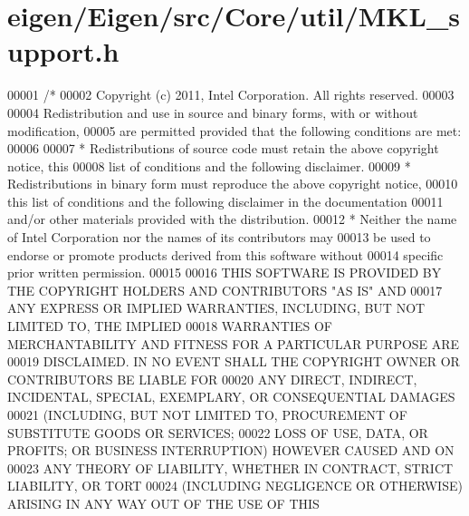 \hypertarget{eigen_2_eigen_2src_2_core_2util_2_m_k_l__support_8h_source}{}\section{eigen/\+Eigen/src/\+Core/util/\+M\+K\+L\+\_\+support.h}
\label{eigen_2_eigen_2src_2_core_2util_2_m_k_l__support_8h_source}

\begin{DoxyCode}
00001 \textcolor{comment}{/*}
00002 \textcolor{comment}{ Copyright (c) 2011, Intel Corporation. All rights reserved.}
00003 \textcolor{comment}{}
00004 \textcolor{comment}{ Redistribution and use in source and binary forms, with or without modification,}
00005 \textcolor{comment}{ are permitted provided that the following conditions are met:}
00006 \textcolor{comment}{}
00007 \textcolor{comment}{ * Redistributions of source code must retain the above copyright notice, this}
00008 \textcolor{comment}{   list of conditions and the following disclaimer.}
00009 \textcolor{comment}{ * Redistributions in binary form must reproduce the above copyright notice,}
00010 \textcolor{comment}{   this list of conditions and the following disclaimer in the documentation}
00011 \textcolor{comment}{   and/or other materials provided with the distribution.}
00012 \textcolor{comment}{ * Neither the name of Intel Corporation nor the names of its contributors may}
00013 \textcolor{comment}{   be used to endorse or promote products derived from this software without}
00014 \textcolor{comment}{   specific prior written permission.}
00015 \textcolor{comment}{}
00016 \textcolor{comment}{ THIS SOFTWARE IS PROVIDED BY THE COPYRIGHT HOLDERS AND CONTRIBUTORS "AS IS" AND}
00017 \textcolor{comment}{ ANY EXPRESS OR IMPLIED WARRANTIES, INCLUDING, BUT NOT LIMITED TO, THE IMPLIED}
00018 \textcolor{comment}{ WARRANTIES OF MERCHANTABILITY AND FITNESS FOR A PARTICULAR PURPOSE ARE}
00019 \textcolor{comment}{ DISCLAIMED. IN NO EVENT SHALL THE COPYRIGHT OWNER OR CONTRIBUTORS BE LIABLE FOR}
00020 \textcolor{comment}{ ANY DIRECT, INDIRECT, INCIDENTAL, SPECIAL, EXEMPLARY, OR CONSEQUENTIAL DAMAGES}
00021 \textcolor{comment}{ (INCLUDING, BUT NOT LIMITED TO, PROCUREMENT OF SUBSTITUTE GOODS OR SERVICES;}
00022 \textcolor{comment}{ LOSS OF USE, DATA, OR PROFITS; OR BUSINESS INTERRUPTION) HOWEVER CAUSED AND ON}
00023 \textcolor{comment}{ ANY THEORY OF LIABILITY, WHETHER IN CONTRACT, STRICT LIABILITY, OR TORT}
00024 \textcolor{comment}{ (INCLUDING NEGLIGENCE OR OTHERWISE) ARISING IN ANY WAY OUT OF THE USE OF THIS}

\end{DoxyCode}
